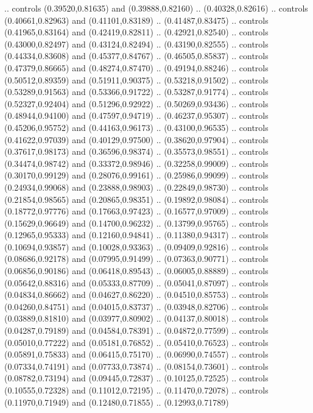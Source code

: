     .. controls (0.39520,0.81635) and (0.39888,0.82160) .. (0.40328,0.82616)
    .. controls (0.40661,0.82963) and (0.41101,0.83189) .. (0.41487,0.83475)
    .. controls (0.41965,0.83164) and (0.42419,0.82811) .. (0.42921,0.82540)
    .. controls (0.43000,0.82497) and (0.43124,0.82494) .. (0.43190,0.82555)
    .. controls (0.44334,0.83608) and (0.45377,0.84767) .. (0.46505,0.85837)
    .. controls (0.47379,0.86665) and (0.48274,0.87470) .. (0.49194,0.88246)
    .. controls (0.50512,0.89359) and (0.51911,0.90375) .. (0.53218,0.91502)
    .. controls (0.53289,0.91563) and (0.53366,0.91722) .. (0.53287,0.91774)
    .. controls (0.52327,0.92404) and (0.51296,0.92922) .. (0.50269,0.93436)
    .. controls (0.48944,0.94100) and (0.47597,0.94719) .. (0.46237,0.95307)
    .. controls (0.45206,0.95752) and (0.44163,0.96173) .. (0.43100,0.96535)
    .. controls (0.41622,0.97039) and (0.40129,0.97500) .. (0.38620,0.97904)
    .. controls (0.37617,0.98173) and (0.36596,0.98374) .. (0.35573,0.98551)
    .. controls (0.34474,0.98742) and (0.33372,0.98946) .. (0.32258,0.99009)
    .. controls (0.30170,0.99129) and (0.28076,0.99161) .. (0.25986,0.99099)
    .. controls (0.24934,0.99068) and (0.23888,0.98903) .. (0.22849,0.98730)
    .. controls (0.21854,0.98565) and (0.20865,0.98351) .. (0.19892,0.98084)
    .. controls (0.18772,0.97776) and (0.17663,0.97423) .. (0.16577,0.97009)
    .. controls (0.15629,0.96649) and (0.14700,0.96232) .. (0.13799,0.95765)
    .. controls (0.12965,0.95333) and (0.12160,0.94841) .. (0.11380,0.94317)
    .. controls (0.10694,0.93857) and (0.10028,0.93363) .. (0.09409,0.92816)
    .. controls (0.08686,0.92178) and (0.07995,0.91499) .. (0.07363,0.90771)
    .. controls (0.06856,0.90186) and (0.06418,0.89543) .. (0.06005,0.88889)
    .. controls (0.05642,0.88316) and (0.05333,0.87709) .. (0.05041,0.87097)
    .. controls (0.04834,0.86662) and (0.04627,0.86220) .. (0.04510,0.85753)
    .. controls (0.04260,0.84751) and (0.04015,0.83737) .. (0.03948,0.82706)
    .. controls (0.03889,0.81810) and (0.03977,0.80902) .. (0.04137,0.80018)
    .. controls (0.04287,0.79189) and (0.04584,0.78391) .. (0.04872,0.77599)
    .. controls (0.05010,0.77222) and (0.05181,0.76852) .. (0.05410,0.76523)
    .. controls (0.05891,0.75833) and (0.06415,0.75170) .. (0.06990,0.74557)
    .. controls (0.07334,0.74191) and (0.07733,0.73874) .. (0.08154,0.73601)
    .. controls (0.08782,0.73194) and (0.09445,0.72837) .. (0.10125,0.72525)
    .. controls (0.10555,0.72328) and (0.11012,0.72195) .. (0.11470,0.72078)
    .. controls (0.11970,0.71949) and (0.12480,0.71855) .. (0.12993,0.71789)
